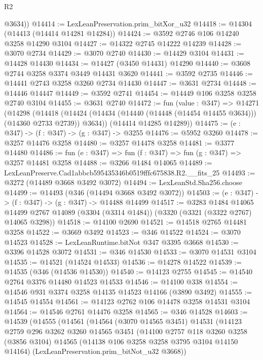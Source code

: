 \begin{lexlean}{R2}
\begin{coremodule}
        @3634))
@14414 := LexLeanPreservation.prim_bitXor_u32
@14418 := @14304 (@14413 (@14414 @14281 @14284))
@14424 := @3592 @2746 @106 @14240 @3258 @14290 @3104
@14427 := @14322 @2745 @14222 @14239
@14428 := @3070 @2734
@14429 := @3070 @2740
@14430 := @14429 @3104
@14431 := @14428 @14430
@14434 := @14427 (@3450 @14431) @14290
@14440 := @3608 @2744 @3258 @3374 @3449 @14431 @3620
@14441 := @3592 @2735
@14446 := @14441 @2743 @3258 @3260 @2734 @14430
@14447 := @3631 @2734
@14448 := @14446 @14447
@14449 := @3592 @2741
@14454 := @14449 @106 @3258 @3258 @2740 @3104
@14455 := @3631 @2740
@14472 := fun (value : @347) =>
  @14271
    (@14298
      (@14418 (@14424 (@14434 (@14440 (@14448 (@14454 @14455 @3634))) (@14360 @2733 @2739)) @3634))
      (@14414 @14285 @14289))
@14475 := (e : @347) -> (f : @347) -> (g : @347) -> @3255
@14476 := @5952 @3260
@14478 := @3257 @14476 @3258
@14480 := @3257 @14478 @3258
@14481 := @3377 @14480
@14486 := fun (e : @347) => fun (f : @347) => fun (g : @347) => @3257 @14481 @3258
@14488 := @3266 @1484 @14065
@14489 := LexLeanPreserve.Cad1abbcb595435346b0519fffc675838.R2.__fits_25
@14493 := @3272 (@14489 @3668 @3492 @3072)
@14494 := LexLeanStd.Sha256.choose
@14499 := @14493 (@346 (@14494 @3668 @3492 @3072))
@14503 := (e : @347) -> (f : @347) -> (g : @347) -> @14488 @14499
@14517 := @3283
    @1484
    @14065
    @14499
    @2767
    @14089
    (@3304 (@3314 @1484))
    (@3320 (@3321 (@3322 @2767) @14065 @3298))
@14518 := @14100 @2690
@14521 := @14518 @2765 @14481 @3258
@14522 := @3669 @3492
@14523 := @346 @14522
@14524 := @3070 @14523
@14528 := LexLeanRuntime.bitNot @347 @3395 @3668
@14530 := @3396 @14528 @3072
@14531 := @346 @14530
@14533 := @3070 @14531 @3104
@14535 := @14521 (@14524 @14533)
@14536 := @14278 @14522
@14539 := @14535 (@346 (@14536 @14530))
@14540 := @14123 @2755
@14545 := @14540 @2764 @3376 @14480 @14523 @14533
@14546 := @14100 @338
@14554 := @14546 @931 @3374 @3258 @14135 @14523 @14166 (@3890 @3492)
@14555 := @14545 @14554
@14561 := @14123 @2762 @106 @14478 @3258 @14531 @3104
@14564 := @14546 @2761 @14476 @3258
@14565 := @346 @14528
@14603 := @14539
    (@14555
      (@14561
        (@14564
          (@3070 @14565 @3451)
          @14531
          (@14123
            @2759
            @296
            @3262
            @3260
            @14565
            @3451
            (@14100
              @2757
              @118
              @3260
              @3258
              (@3856 @3104)
              @14565
              (@14138 @106 @3258 @3258 @3795 @3104 @14150 @14164)
              (LexLeanPreservation.prim_bitNot_u32 @3668))

\end{coremodule}
\end{lexlean}
